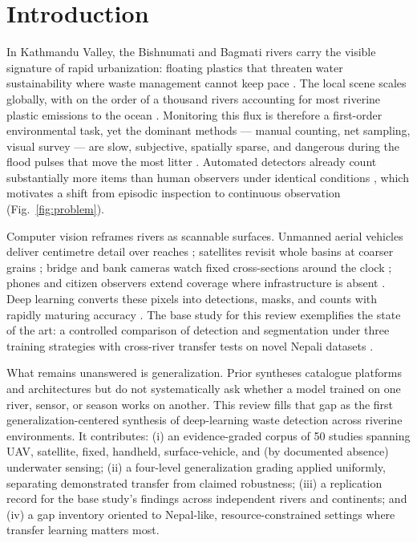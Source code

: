 \section{Introduction}
\label{sec:introduction}

In Kathmandu Valley, the Bishnumati and Bagmati rivers carry the visible signature of rapid urbanization: floating plastics that threaten water sustainability where waste management cannot keep pace \cite{Pati2025}. The local scene scales globally, with on the order of a thousand rivers accounting for most riverine plastic emissions to the ocean \cite{Meijer2021}. Monitoring this flux is therefore a first-order environmental task, yet the dominant methods --- manual counting, net sampling, visual survey --- are slow, subjective, spatially sparse, and dangerous during the flood pulses that move the most litter \cite{Lieshout2020,Hurley2023}. Automated detectors already count substantially more items than human observers under identical conditions \cite{Lieshout2020}, which motivates a shift from episodic inspection to continuous observation (Fig.~\ref{fig:problem}).


Computer vision reframes rivers as scannable surfaces. Unmanned aerial vehicles deliver centimetre detail over reaches \cite{Maharjan2022,Jakovljevic2020}; satellites revisit whole basins at coarser grains \cite{SoleGomez2022,Mohsen2023}; bridge and bank cameras watch fixed cross-sections around the clock \cite{Lieshout2020,Reinhardt2024}; phones and citizen observers extend coverage where infrastructure is absent \cite{JiaFrontiers2023,Tharani2021}. Deep learning converts these pixels into detections, masks, and counts with rapidly maturing accuracy \cite{Jia2023}. The base study for this review exemplifies the state of the art: a controlled comparison of detection and segmentation under three training strategies with cross-river transfer tests on novel Nepali datasets \cite{Pati2025}.

What remains unanswered is generalization. Prior syntheses catalogue platforms \cite{Marye2025} and architectures \cite{Jia2023} but do not systematically ask whether a model trained on one river, sensor, or season works on another. This review fills that gap as the first generalization-centered synthesis of deep-learning waste detection across riverine environments. It contributes: (i) an evidence-graded corpus of 50 studies spanning UAV, satellite, fixed, handheld, surface-vehicle, and (by documented absence) underwater sensing; (ii) a four-level generalization grading applied uniformly, separating demonstrated transfer from claimed robustness; (iii) a replication record for the base study's findings across independent rivers and continents; and (iv) a gap inventory oriented to Nepal-like, resource-constrained settings where transfer learning matters most.
